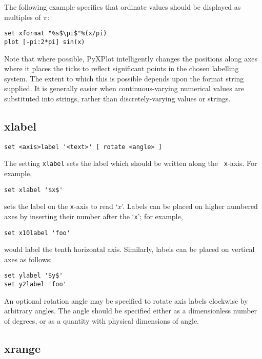 The following example specifies that ordinate values should be displayed as
multiples of $\pi$:
\begin{verbatim}
set xformat "%s$\pi$"%(x/pi)
plot [-pi:2*pi] sin(x)
\end{verbatim}

Note that where possible, PyXPlot intelligently changes the positions along
axes where it places the ticks to reflect significant points in the chosen
labelling system.  The extent to which this is possible depends upon the format
string supplied. It is generally easier when continuous-varying numerical
values are substituted into strings, rather than discretely-varying values or
strings.

\subsection{xlabel}

\begin{verbatim}
set <axis>label '<text>' [ rotate <angle> ]
\end{verbatim}

The setting {\tt xlabel} sets the label which should be written along the {\tt
x}-axis.  For example,

\begin{verbatim}
set xlabel '$x$'
\end{verbatim}

\noindent sets the label on the {\tt x}-axis to read `$x$'.  Labels can be
placed on higher numbered axes by inserting their number after the `{\tt x}';
for example,

\begin{verbatim}
set x10label 'foo'
\end{verbatim}

\noindent would label the tenth horizontal axis. Similarly, labels can be
placed on vertical axes as follows:

\begin{verbatim}
set ylabel '$y$'
set y2label 'foo'
\end{verbatim}

An optional rotation angle may be specified to rotate axis labels clockwise by
arbitrary angles. The angle should be specified either as a dimensionless
number of degrees, or as a quantity with physical dimensions of angle.

\subsection{xrange}

